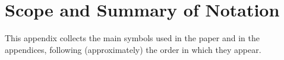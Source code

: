 \documentclass{article}
\theoremstyle{plain}
\theoremstyle{definition}
\theoremstyle{remark}
\begin{document}





\newpage
\appendix
\onecolumn





\appendix

\section{Scope and Summary of Notation}
\label{app:notation}

This appendix collects the main symbols used in the paper and in the appendices, following (approximately) the order in which they appear.
\end{document}
